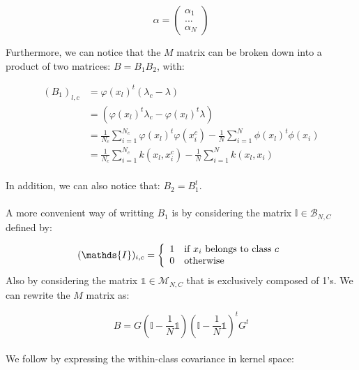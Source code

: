\begin{equation*}
\alpha = \left( \begin{array}{c}
                                \alpha_1 \\
                                ... \\
                                \alpha_N
                  \end{array}  \right) 
\end{equation*}

Furthermore, we can notice that the $M$ matrix can be broken down into a product of two matrices: $B = B_1B_2$, with:

\begin{align*}
(B_1)_{l, c} &= \varphi(x_l)^t(\lambda_c - \lambda)\\
             &= (\varphi(x_l)^t\lambda_c -\varphi(x_l)^t\lambda) \\
             &= \frac{1}{N_c} \sum_{i=1}^{N_c} \varphi(x_l)^t\varphi(x_i^c) -
                 \frac{1}{N}\sum_{i=1}^N\phi(x_l)^t\phi(x_i) \\
             &= \frac{1}{N_c} \sum_{i = 1}^{N_c} k(x_l, x_i^c) -
                \frac{1}{N}\sum_{i=1}^N k(x_l, x_i)\\
\end{align*}

In addition, we can also notice that: $B_2 = B_1^t$.

\paragraph{}
A more convenient way of writting $B_1$ is by considering the matrix $\mathds{I} \in
\mathcal{B}_{N,C}$ defined by:

$$ (\mathds{I})_{i, c} = \left\{ \begin{array}{ll}
                                  1 & \textnormal{if $x_i$ belongs to class $c$} \\
                                  0 & \textnormal{otherwise}
                               \end{array}
                        \right.$$
Also by considering the matrix $\mathds{1} \in \mathcal{M}_{N,C}$ that is exclusively composed of
1's.
We can rewrite the $M$ matrix as:

$$B = G\left( \mathds{I} - \frac{1}{N} \mathds{1} \right)\left( \mathds{I} - \frac{1}{N} \mathds{1}\right)^tG^t$$

\paragraph{}
We follow by expressing the within-class covariance in kernel space:

